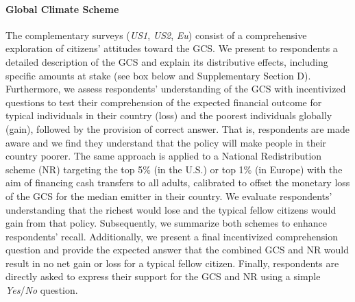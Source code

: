 
\paragraph{Global Climate Scheme}\label{subsubsec:support_gcs} %

The complementary surveys (\textit{US1}, \textit{US2}, \textit{Eu}) consist of a comprehensive exploration of citizens' attitudes toward the GCS. We present to respondents a detailed description of the GCS and explain its distributive effects, including specific amounts at stake (see box below and Supplementary Section D). 
Furthermore, we assess respondents' understanding of the GCS with incentivized questions to test their comprehension of the expected financial outcome for typical individuals in their country (loss) and the poorest individuals globally (gain), followed by the provision of correct answer. %
That is, respondents are made aware and we find they understand that the policy will make people in their country poorer. 
The same approach is applied to a National Redistribution scheme (NR) targeting the top 5\% (in the U.S.) or top 1\% (in Europe) with the aim of financing cash transfers to all adults, %
calibrated to offset the monetary loss of the GCS for the median emitter in their country. We evaluate respondents' understanding that the richest would lose and the typical fellow citizens would gain from that policy. %
Subsequently, we summarize both schemes to enhance respondents' recall. Additionally, we present a final incentivized comprehension question and provide the expected answer that the combined GCS and NR would result in no net gain or loss for a typical fellow citizen. Finally, respondents are directly asked to express their support for the GCS and NR using a simple \textit{Yes}/\textit{No} question. %


